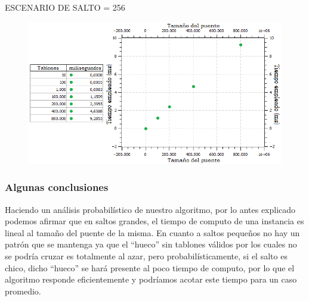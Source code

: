 \documentclass[10pt,a4paper]{article}
\begin{document}
\indent ESCENARIO DE SALTO = 256
	\begin{figure}[h]
		\begin{center}
		   \includegraphics[scale=0.90]{casosDeTest/GRAFICOS/png/randoms/ej1_random_salto256.png}
		\end{center}
	\end{figure}


\subsubsection{Algunas conclusiones}
Haciendo un análisis probabilístico de nuestro algoritmo, por lo antes explicado podemos afirmar que en saltos grandes, el tiempo de computo de una instancia es lineal al tamaño del puente de la misma.
En cuanto a saltos pequeños no hay un patrón que se mantenga ya que el “hueco” sin tablones válidos por los cuales no se podría cruzar es totalmente al azar, pero probabilísticamente, si el salto es chico, dicho “hueco” se hará presente al poco tiempo de computo, por lo que el algoritmo responde eficientemente y podríamos acotar este tiempo para un caso promedio.
\end{document}
